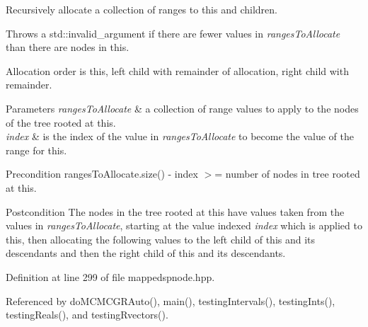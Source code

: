 \-Recursively allocate a collection of ranges to this and children. 

\-Throws a std\-::invalid\-\_\-argument if there are fewer values in {\itshape ranges\-To\-Allocate\/} than there are nodes in this.

\-Allocation order is this, left child with remainder of allocation, right child with remainder.


\begin{DoxyParams}{\-Parameters}
{\em ranges\-To\-Allocate} & a collection of range values to apply to the nodes of the tree rooted at this. \\
\hline
{\em index} & is the index of the value in {\itshape ranges\-To\-Allocate\/} to become the value of the range for this. \\
\hline
\end{DoxyParams}
\begin{DoxyPrecond}{\-Precondition}
ranges\-To\-Allocate.\-size() -\/ index $>$= number of nodes in tree rooted at this. 
\end{DoxyPrecond}
\begin{DoxyPostcond}{\-Postcondition}
\-The nodes in the tree rooted at this have values taken from the values in {\itshape ranges\-To\-Allocate\/}, starting at the value indexed {\itshape index\/} which is applied to this, then allocating the following values to the left child of this and its descendants and then the right child of this and its descendants. 
\end{DoxyPostcond}


\-Definition at line 299 of file mappedspnode.\-hpp.



\-Referenced by do\-M\-C\-M\-C\-G\-R\-Auto(), main(), testing\-Intervals(), testing\-Ints(), testing\-Reals(), and testing\-Rvectors().


